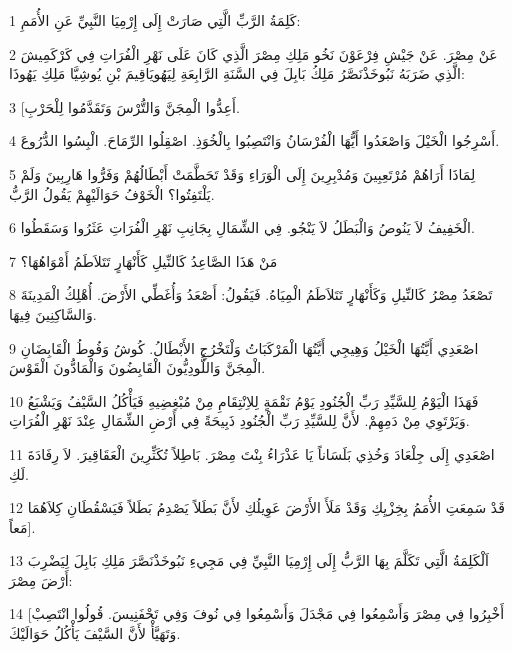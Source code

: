 \par 1 كَلِمَةُ الرَّبِّ الَّتِي صَارَتْ إِلَى إِرْمِيَا النَّبِيِّ عَنِ الأُمَمِ:
\par 2 عَنْ مِصْرَ. عَنْ جَيْشِ فِرْعَوْنَ نَخُو مَلِكِ مِصْرَ الَّذِي كَانَ عَلَى نَهْرِ الْفُرَاتِ فِي كَرْكَمِيشَ الَّذِي ضَرَبَهُ نَبُوخَذْنَصَّرُ مَلِكُ بَابِلَ فِي السَّنَةِ الرَّابِعَةِ لِيَهُويَاقِيمَ بْنِ يُوشِيَّا مَلِكِ يَهُوذَا:
\par 3 [أَعِدُّوا الْمِجَنَّ وَالتُّرْسَ وَتَقَدَّمُوا لِلْحَرْبِ.
\par 4 أَسْرِجُوا الْخَيْلَ وَاصْعَدُوا أَيُّهَا الْفُرْسَانُ وَانْتَصِبُوا بِالْخُوَذِ. اصْقِلُوا الرِّمَاحَ. الْبِسُوا الدُّرُوعَ.
\par 5 لِمَاذَا أَرَاهُمْ مُرْتَعِبِينَ وَمُدْبِرِينَ إِلَى الْوَرَاءِ وَقَدْ تَحَطَّمَتْ أَبْطَالُهُمْ وَفَرُّوا هَارِبِينَ وَلَمْ يَلْتَفِتُوا؟ الْخَوْفُ حَوَالَيْهِمْ يَقُولُ الرَّبُّ.
\par 6 الْخَفِيفُ لاَ يَنُوصُ وَالْبَطَلُ لاَ يَنْجُو. فِي الشِّمَالِ بِجَانِبِ نَهْرِ الْفُرَاتِ عَثَرُوا وَسَقَطُوا.
\par 7 مَنْ هَذَا الصَّاعِدُ كَالنِّيلِ كَأَنْهَارٍ تَتَلاَطَمُ أَمْوَاهُهَا؟
\par 8 تَصْعَدُ مِصْرُ كَالنِّيلِ وَكَأَنْهَارٍ تَتَلاَطَمُ الْمِيَاهُ. فَيَقُولُ: أَصْعَدُ وَأُغَطِّي الأَرْضَ. أُهْلِكُ الْمَدِينَةَ وَالسَّاكِنِينَ فِيهَا.
\par 9 اصْعَدِي أَيَّتُهَا الْخَيْلُ وَهِيجِي أَيَّتُهَا الْمَرْكَبَاتُ وَلْتَخْرُجِ الأَبْطَالُ. كُوشُ وَفُوطُ الْقَابِضَانِ الْمِجَنَّ وَاللُّودِيُّونَ الْقَابِضُونَ وَالْمَادُّونَ الْقَوْسَ.
\par 10 فَهَذَا الْيَوْمُ لِلسَّيِّدِ رَبِّ الْجُنُودِ يَوْمُ نَقْمَةٍ لِلاِنْتِقَامِ مِنْ مُبْغِضِيهِ فَيَأْكُلُ السَّيْفُ وَيَشْبَعُ وَيَرْتَوِي مِنْ دَمِهِمْ. لأَنَّ لِلسَّيِّدِ رَبِّ الْجُنُودِ ذَبِيحَةً فِي أَرْضِ الشِّمَالِ عِنْدَ نَهْرِ الْفُرَاتِ.
\par 11 اصْعَدِي إِلَى جِلْعَادَ وَخُذِي بَلَسَاناً يَا عَذْرَاءُ بِنْتَ مِصْرَ. بَاطِلاً تُكَثِّرِينَ الْعَقَاقِيرَ. لاَ رِفَادَةَ لَكِ.
\par 12 قَدْ سَمِعَتِ الأُمَمُ بِخِزْيِكِ وَقَدْ مَلَأَ الأَرْضَ عَوِيلُكِ لأَنَّ بَطَلاً يَصْدِمُ بَطَلاً فَيَسْقُطَانِ كِلاَهُمَا مَعاً].
\par 13 اَلْكَلِمَةُ الَّتِي تَكَلَّمَ بِهَا الرَّبُّ إِلَى إِرْمِيَا النَّبِيِّ فِي مَجِيءِ نَبُوخَذْنَصَّرَ مَلِكِ بَابِلَ لِيَضْرِبَ أَرْضَ مِصْرَ:
\par 14 [أَخْبِرُوا فِي مِصْرَ وَأَسْمِعُوا فِي مَجْدَلَ وَأَسْمِعُوا فِي نُوفَ وَفِي تَحْفَنِيسَ. قُولُوا انْتَصِبْ وَتَهَيَّأْ لأَنَّ السَّيْفَ يَأْكُلُ حَوَالَيْكَ.
